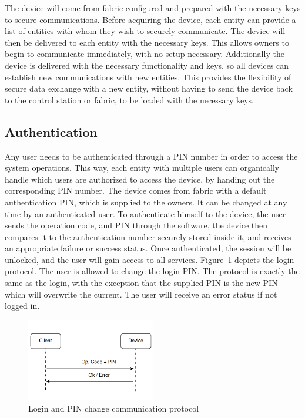 The device will come from fabric configured and prepared with the necessary keys to secure communications.
Before acquiring the device, each entity can provide a list of entities with whom they wish to securely communicate. The device will then be delivered to each entity with the necessary keys. This allows owners to begin to communicate immediately, with no setup necessary.
Additionally the device is delivered with the necessary functionality and keys, so all devices can establish new communications with new entities. This provides the flexibility of secure data exchange with a new entity, without having to send the device back to the control station or fabric, to be loaded with the necessary keys.

\subsection{Authentication}\label{chap:arch:services:auth}

Any user needs to be authenticated through a \ac{PIN} number in order to access the system operations. This way, each entity with multiple users can organically handle which users are authorized to access the device, by handing out the corresponding \ac{PIN} number.
The device comes from fabric with a default authentication \ac{PIN}, which is supplied to the owners. It can be changed at any time by an authenticated user.
To authenticate himself to the device, the user sends the operation code, and \ac{PIN} through the software, the device then compares it to the authentication number securely stored inside it, and receives an appropriate failure or success status. Once authenticated, the session will be unlocked, and the user will gain access to all services.
Figure~\ref{fig:protocol:login} depicts the login protocol.
The user is allowed to change the login \ac{PIN}. The protocol is exactly the same as the login, with the exception that the supplied \ac{PIN} is the new \ac{PIN} which will overwrite the current. The user will receive an error status if not logged in.

\begin{figure}[h!]
	\centering
	\includegraphics[width=0.50\textwidth]{./Images/authentication.png}
	\caption{Login and PIN change communication protocol}
	\label{fig:protocol:login}
\end{figure}

